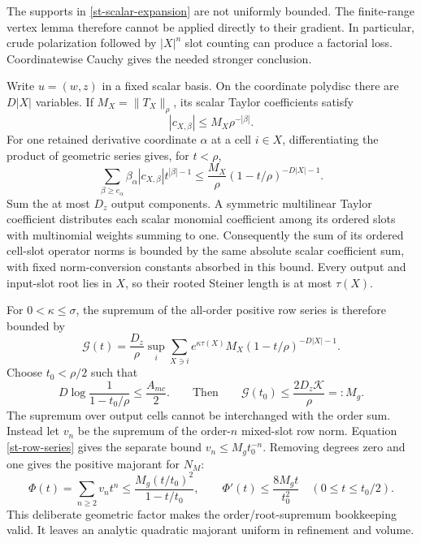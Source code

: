 \documentclass[11pt]{article}
\theoremstyle{remark}\newtheorem{remark}[theorem]{Remark}
\begin{document}
The supports in \eqref{st-scalar-expansion} are not uniformly bounded.
The finite-range vertex lemma therefore cannot be applied directly to
their gradient. In particular, crude polarization followed by
$|X|^n$ slot counting can produce a factorial loss. Coordinatewise
Cauchy gives the needed stronger conclusion.

Write $u=(w,z)$ in a fixed scalar basis. On the coordinate polydisc
there are $D|X|$ variables. If $M_X=\|T_X\|_\rho$, its scalar Taylor
coefficients satisfy
\begin{equation}
 |c_{X,\beta}|\le M_X\rho^{-|\beta|}.                       \label{st-scalar-cauchy}
\end{equation}
For one retained derivative coordinate $\alpha$ at a cell $i\in X$,
differentiating the product of geometric series gives, for $t<\rho$,
\begin{equation}
 \sum_{\beta\ge e_\alpha}
 \beta_\alpha |c_{X,\beta}|t^{|\beta|-1}
 \le\frac{M_X}{\rho}(1-t/\rho)^{-D|X|-1}.                   \label{st-gradient-cauchy}
\end{equation}
Sum the at most $D_z$ output components. A symmetric multilinear Taylor
coefficient distributes each scalar monomial coefficient among its
ordered slots with multinomial weights summing to one. Consequently
the sum of its ordered cell-slot operator norms is bounded by the same
absolute scalar coefficient sum, with fixed norm-conversion constants
absorbed in this bound. Every output and input-slot root lies in $X$,
so their rooted Steiner length is at most $\tau(X)$.

For $0<\kappa\le\sigma$, the supremum of the all-order positive row
series is therefore bounded by
\begin{equation}
 \mathcal G(t)=\frac{D_z}{\rho}\sup_i\sum_{X\ni i}
 e^{\kappa\tau(X)}M_X(1-t/\rho)^{-D|X|-1}.                  \label{st-row-series}
\end{equation}
Choose $t_0<\rho/2$ such that
\begin{equation}
 D\log\frac1{1-t_0/\rho}\le\frac{A_{
m c}}2.
 \qquad\text{Then}\qquad
 \mathcal G(t_0)\le\frac{2D_z\mathcal K}{\rho}=:M_g.         \label{st-majorant-radius}
\end{equation}
The supremum over output cells cannot be interchanged with the order
sum. Instead let $v_n$ be the supremum of the order-$n$ mixed-slot row
norm. Equation \eqref{st-row-series} gives the separate bound
$v_n\le M_gt_0^{-n}$. Removing degrees zero and one gives the positive
majorant for $N_M$:
\begin{equation}
 \Phi(t)=\sum_{n\ge2}v_nt^n
 \le\frac{M_g(t/t_0)^2}{1-t/t_0},\qquad
 \Phi'(t)\le\frac{8M_gt}{t_0^2}\quad(0\le t\le t_0/2).
                                                               \label{st-nonlinear-majorant}
\end{equation}
This deliberate geometric factor makes the order/root-supremum
bookkeeping valid. It leaves an analytic quadratic majorant uniform in
refinement and volume.
\end{document}
